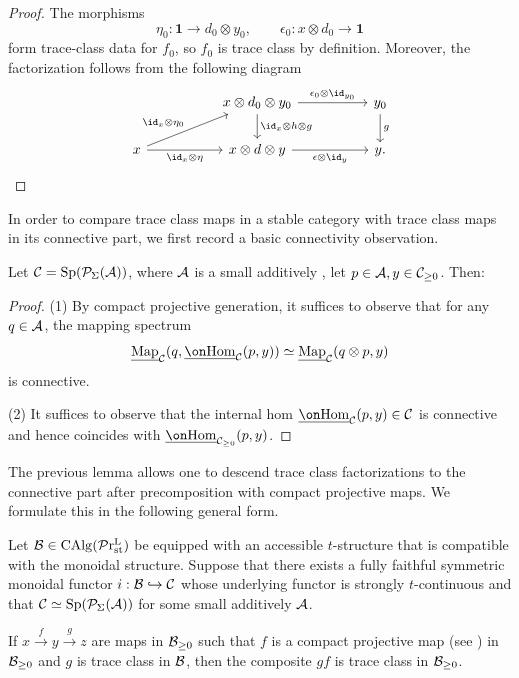 \documentclass[a4paper,10pt, oneside]{amsart}
\begin{document}
	\begin{proof}
		The morphisms
		\[
		\eta_0:\mathbf{1}\to d_0\otimes y_0,
		\qquad
		\epsilon_0:x\otimes d_0\to\mathbf{1}
		\]
		form trace-class data for $f_0$, so $f_0$ is trace class by definition.
		Moreover, the factorization follows from the following diagram
		$$\begin{tikzcd}[column sep=5em] & x\otimes d_0\otimes y_0 \arrow[r,"\epsilon_0\otimes\id_{y_0}"] \arrow[d,"\id_x\otimes h\otimes g"] & y_0 \arrow[d,"g"] \\ x \arrow[ru,"\id_x\otimes\eta_0"] \arrow[r,"\id_x\otimes\eta"'] & x\otimes d\otimes y \arrow[r,"\epsilon\otimes\id_y"'] & y . \end{tikzcd}$$
	\end{proof}
	In order to compare trace class maps in a stable category with trace class maps in its connective part, we first record a basic connectivity observation.
	\begin{lem}

		Let  $\mathcal{C}=\mathrm{Sp}(\mathcal{P}_{\Sigma}(\mathcal{A}))$, where $\mathcal{A}$ is a small additively \syminfcat, let $p \in \mathcal{A}, y \in \mathcal{C}_{\geq 0}$. Then: 

	\end{lem}
	\begin{proof}
		(1) By compact projective generation, it suffices to observe that for any $q\in \mathcal{A}$, the mapping spectrum $$\unmap_{\mcc}(q,\underline{\Hom}_{\mcc}(p,y))\simeq\unmap_{\mcc}(q\otimes p,y) $$ is connective.
		
	(2)	It suffices to observe that the internal hom $\underline{\Hom}_{\mcc}(p,y)\in\mcc$ is connective and hence coincides with $\underline{\Hom}_{\mcc_{\geq0}}(p,y)$.
	\end{proof}
	The previous lemma allows one to descend trace class factorizations to the connective part after precomposition with compact projective maps. We formulate this in the following general form.
	\begin{lem}\label{conntrcl}
		Let $\mathcal{B}\in \operatorname{CAlg}(\mathcal{P}\mathrm{r}_{\mathrm{st}}^\mathrm{L})$ be equipped with an accessible $t$-structure that is compatible with the monoidal structure.  Suppose that there exists a fully faithful symmetric monoidal functor $i:\mathcal{B}\hookrightarrow \mathcal{C}$  whose underlying functor is strongly $t$-continuous and that $\mathcal{C}\simeq\mathrm{Sp}(\mathcal{P}_{\Sigma}(\mathcal{A}))$ for some  small additively \syminfcat $\mathcal{A}$. 
		
		If $x\xrightarrow{f} y\xrightarrow{g} z$ are maps in $\mathcal{B}_{\geq0}$ such that $f$ is a compact projective map (see ) in $\mathcal{B}_{\geq0}$ and $g$ is trace class in $\mathcal{B}$, then the composite $gf$ is trace class in $\mathcal{B}_{\geq0}$.
	\end{lem}
\end{document}
